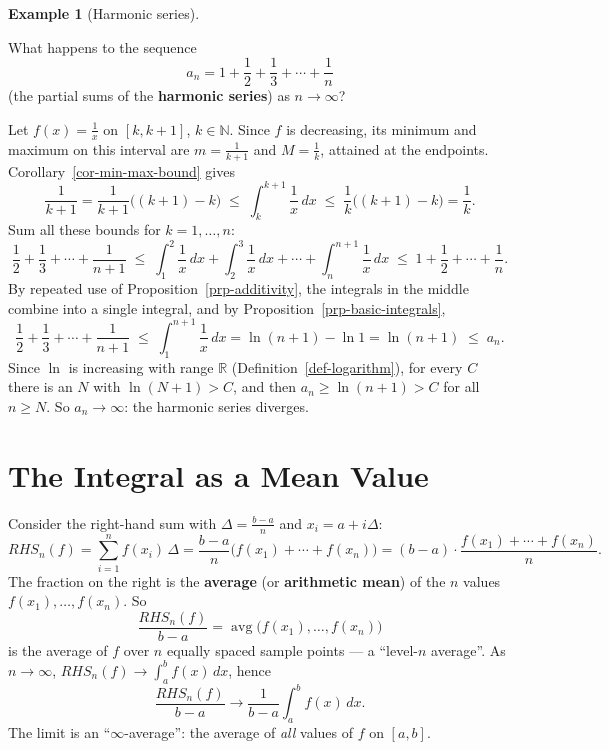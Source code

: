 \documentclass[
  letterpaper,
  DIV=11,
  numbers=noendperiod]{scrreprt}
\theoremstyle{plain}
\theoremstyle{plain}
\theoremstyle{definition}
\theoremstyle{definition}
\theoremstyle{definition}
\newtheorem{example}{Example}[chapter]
\theoremstyle{plain}
\theoremstyle{plain}
\theoremstyle{remark}
\begin{document}
\begin{example}[Harmonic
series]\protect\hypertarget{exm-harmonic-divergence}{}\label{exm-harmonic-divergence}

\hfill\break
What happens to the sequence \[
a_n = 1 + \frac12 + \frac13 + \cdots + \frac1n
\] (the partial sums of the \textbf{harmonic series}) as \(n\to\infty\)?

Let \(f(x)=\frac1x\) on \([k,k+1]\), \(k\in\mathbb{N}\). Since \(f\) is
decreasing, its minimum and maximum on this interval are
\(m=\frac1{k+1}\) and \(M=\frac1k\), attained at the endpoints.
Corollary~\ref{cor-min-max-bound} gives \[
\frac1{k+1} = \frac1{k+1}\big((k+1)-k\big) \;\le\; \int_k^{k+1}\frac1x\,dx
\;\le\; \frac1k\big((k+1)-k\big) = \frac1k .
\] Sum all these bounds for \(k=1,\ldots,n\): \[
\frac12 + \frac13 + \cdots + \frac1{n+1}
\;\le\; \int_1^2 \frac1x\,dx + \int_2^3\frac1x\,dx + \cdots + \int_n^{n+1}\frac1x\,dx
\;\le\; 1 + \frac12 + \cdots + \frac1n .
\] By repeated use of Proposition~\ref{prp-additivity}, the integrals in
the middle combine into a single integral, and by
Proposition~\ref{prp-basic-integrals}, \[
\frac12 + \frac13 + \cdots + \frac1{n+1} \;\le\; \int_1^{n+1}\frac1x\,dx = \ln(n+1) - \ln 1 = \ln(n+1)
\;\le\; a_n .
\] Since \(\ln\) is increasing with range \(\mathbb{R}\)
(Definition~\ref{def-logarithm}), for every \(C\) there is an \(N\) with
\(\ln(N+1) > C\), and then \(a_n\ge\ln(n+1)>C\) for all \(n\ge N\). So
\(a_n\to\infty\): the harmonic series diverges.

\end{example}

\section{The Integral as a Mean
Value}\label{the-integral-as-a-mean-value}

Consider the right-hand sum with \(\Delta=\frac{b-a}{n}\) and
\(x_i = a+i\Delta\): \[
RHS_n(f) = \sum_{i=1}^n f(x_i)\,\Delta = \frac{b-a}{n}\big(f(x_1)+\cdots+f(x_n)\big)
= (b-a)\cdot\frac{f(x_1)+\cdots+f(x_n)}{n} .
\] The fraction on the right is the \textbf{average} (or
\textbf{arithmetic mean}) of the \(n\) values \(f(x_1),\ldots,f(x_n)\).
So \[
\frac{RHS_n(f)}{b-a} = \operatorname{avg}\big(f(x_1),\ldots,f(x_n)\big)
\] is the average of \(f\) over \(n\) equally spaced sample points --- a
``level-\(n\) average''. As \(n\to\infty\),
\(RHS_n(f)\to\int_a^b f(x)\,dx\), hence \[
\frac{RHS_n(f)}{b-a} \longrightarrow \frac1{b-a}\int_a^b f(x)\,dx .
\] The limit is an ``\(\infty\)-average'': the average of \emph{all}
values of \(f\) on \([a,b]\).
\end{document}
